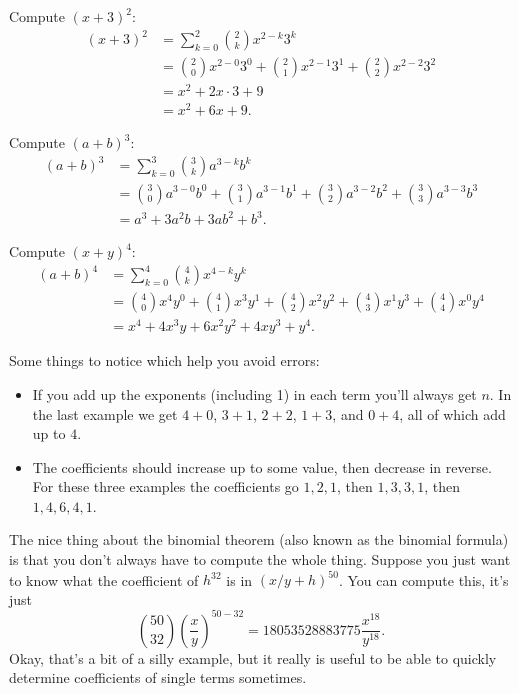 \documentclass[fleqn]{LectureClass/LectureClass}
\begin{document}
     \begin{exm}{}{}
         Compute \((x + 3)^2\):
         \begin{align}
             (x + 3)^2 &= \sum_{k=0}^2 \binom{2}{k} x^{2 - k}3^k\\
             &= \binom{2}{0} x^{2 - 0} 3^0 + \binom{2}{1} x^{2 - 1} 3^1 + \binom{2}{2} x^{2 - 2} 3^2\\
             &= x^2 + 2 x \cdot 3 + 9\\
             &= x^2 + 6x + 9.
         \end{align}
         
         Compute \((a + b)^3\):
         \begin{align}
             (a + b)^3 &= \sum_{k=0}^3 \binom{3}{k} a^{3 - k} b^k\\
             &= \binom{3}{0} a^{3 - 0} b^0 + \binom{3}{1} a^{3 - 1} b^1 + \binom{3}{2} a^{3 - 2} b^2 + \binom{3}{3} a^{3 - 3} b^3\\
             &= a^3 + 3a^2b + 3ab^2 + b^3.
         \end{align}
         
         Compute \((x + y)^4\):
         \begingroup
         \allowdisplaybreaks
         \begin{align}
             (a + b)^4 &= \sum_{k=0}^4 \binom{4}{k} x^{4 - k} y^k\\
             &= \binom{4}{0} x^4 y^0 + \binom{4}{1} x^3 y^1 + \binom{4}{2} x^2 y^2 + \binom{4}{3} x^1 y^3 + \binom{4}{4} x^0 y^4\\
             &= x^4 + 4x^3y + 6x^2y^2 + 4xy^3 + y^4.
         \end{align}
         \endgroup
     \end{exm}
     
     Some things to notice which help you avoid errors:
     \begin{itemize}
         \item If you add up the exponents (including 1) in each term you'll always get \(n\).
         In the last example we get \(4 + 0\), \(3 + 1\), \(2 + 2\), \(1 + 3\), and \(0 + 4\), all of which add up to \(4\).
         \item The coefficients should increase up to some value, then decrease in reverse.
         For these three examples the coefficients go \(1, 2, 1\), then \(1, 3, 3, 1\), then \(1, 4, 6, 4, 1\).
     \end{itemize}
     
     The nice thing about the binomial theorem (also known as the binomial formula) is that you don't always have to compute the whole thing.
     Suppose you just want to know what the coefficient of \(h^{32}\) is in \((x/y + h)^{50}\).
     You can compute this, it's just
     \begin{equation}
         \binom{50}{32} \left( \frac{x}{y} \right)^{50 - 32} = 18053528883775\frac{x^{18}}{y^{18}}.
     \end{equation}
     Okay, that's a bit of a silly example, but it really is useful to be able to quickly determine coefficients of single terms sometimes.
     
\end{document}
